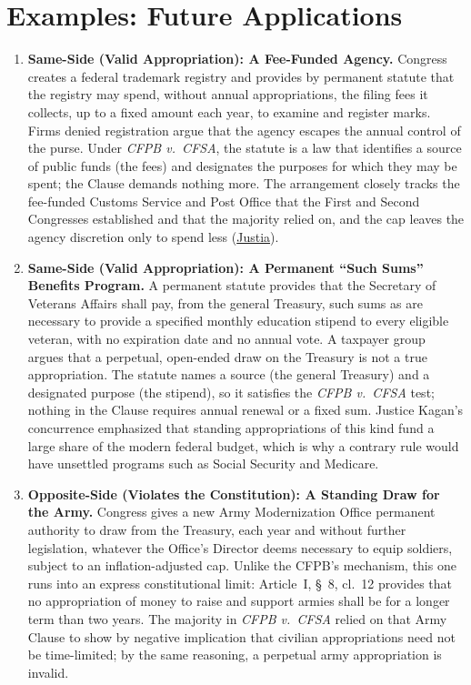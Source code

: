 \documentclass[12pt]{article}
\begin{document}
\section{Examples: Future Applications}
\begin{enumerate}

\item \textbf{Same-Side (Valid Appropriation): A Fee-Funded Agency.} Congress creates a federal trademark registry and provides by permanent statute that the registry may spend, without annual appropriations, the filing fees it collects, up to a fixed amount each year, to examine and register marks. Firms denied registration argue that the agency escapes the annual control of the purse. Under \textit{CFPB v.\ CFSA}, the statute is a law that identifies a source of public funds (the fees) and designates the purposes for which they may be spent; the Clause demands nothing more. The arrangement closely tracks the fee-funded Customs Service and Post Office that the First and Second Congresses established and that the majority relied on, and the cap leaves the agency discretion only to spend less (\href{https://supreme.justia.com/cases/federal/us/601/22-448/}{Justia}).

\item \textbf{Same-Side (Valid Appropriation): A Permanent ``Such Sums'' Benefits Program.} A permanent statute provides that the Secretary of Veterans Affairs shall pay, from the general Treasury, such sums as are necessary to provide a specified monthly education stipend to every eligible veteran, with no expiration date and no annual vote. A taxpayer group argues that a perpetual, open-ended draw on the Treasury is not a true appropriation. The statute names a source (the general Treasury) and a designated purpose (the stipend), so it satisfies the \textit{CFPB v.\ CFSA} test; nothing in the Clause requires annual renewal or a fixed sum. Justice Kagan's concurrence emphasized that standing appropriations of this kind fund a large share of the modern federal budget, which is why a contrary rule would have unsettled programs such as Social Security and Medicare.

\item \textbf{Opposite-Side (Violates the Constitution): A Standing Draw for the Army.} Congress gives a new Army Modernization Office permanent authority to draw from the Treasury, each year and without further legislation, whatever the Office's Director deems necessary to equip soldiers, subject to an inflation-adjusted cap. Unlike the CFPB's mechanism, this one runs into an express constitutional limit: Article~I, \S~8, cl.~12 provides that no appropriation of money to raise and support armies shall be for a longer term than two years. The majority in \textit{CFPB v.\ CFSA} relied on that Army Clause to show by negative implication that civilian appropriations need not be time-limited; by the same reasoning, a perpetual army appropriation is invalid.


\end{enumerate}
\end{document}
